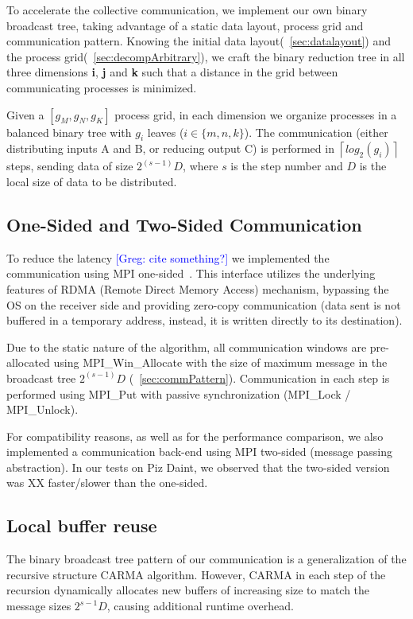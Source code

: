 \documentclass[sigplan,review,anonymous]{acmart}\settopmatter{printfolios=true,printccs=false,printacmref=false}
\newcommand\greg[1]{\textcolor{blue}{[Greg: #1]}}
\begin{document}
To accelerate the collective communication, we implement our own binary 
broadcast 
tree, taking advantage of a static data layout, process grid and communication 
pattern.
 Knowing the initial data 
layout(~\cref{sec:datalayout}) and the process 
grid(~\cref{sec:decompArbitrary}), we craft the binary reduction tree 
in all three dimensions \textbf{i}, \textbf{j} and \textbf{k} such that a 
distance in the grid between communicating processes is minimized. 

Given a $[g_M, g_N, g_K]$ process grid, in each dimension we organize processes 
in a balanced binary tree with $g_i$ leaves ($i \in \{m,n,k\}$). The 
communication 
(either distributing inputs A and B, or reducing output C) is performed in 
$\left \lceil{log_2(g_i)} \right \rceil$ steps, sending data of size $2^(s-1) 
D$, where $s$ is the step 
number and $D$ is the local size of data to be distributed.

\subsection{One-Sided and Two-Sided Communication}
\label{sec:rdma}
To reduce the latency \greg{cite something?} we implemented the communication 
using MPI one-sided~\cite{mpi3-rma-overview}. This interface utilizes the 
underlying features of RDMA (Remote Direct Memory Access) mechanism, bypassing 
the OS on the receiver side and providing zero-copy communication (data sent is 
not buffered in a temporary address, instead, it is written directly to its 
destination).

Due to the static nature of the algorithm, all communication windows are 
pre-allocated using MPI\_Win\_Allocate with the size of maximum message in the 
broadcast tree $2^(s-1) D$ (~\cref{sec:commPattern}). Communication in each 
step is performed using MPI\_Put with passive synchronization (MPI\_Lock / 
MPI\_Unlock).

For compatibility reasons, as well as for the performance comparison, we also 
implemented a communication back-end using MPI two-sided (message passing 
abstraction). In our tests on Piz Daint, we observed that the two-sided version 
was XX faster/slower than the one-sided.


\subsection{Local buffer reuse}
\label{sec:bufferReuse}
The binary broadcast tree pattern of our communication is a generalization of 
the recursive structure CARMA algorithm. However, CARMA in each step of the 
recursion dynamically allocates new buffers of increasing size to match the 
message sizes $2^{s-1} D$, causing additional runtime overhead.
\end{document}
